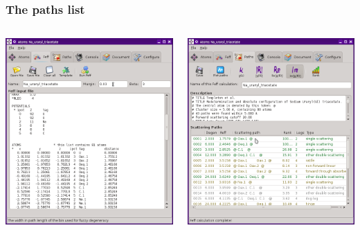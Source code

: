 \documentclass[10pt, xcolor=x11names, compress]{beamer}
\begin{document}
\begin{frame}
  \frametitle{The paths list}
  \begin{columns}[T]
    \begin{column}{0.5\linewidth}
      \begin{center}
        \includegraphics[width=0.85\linewidth]{images/feffinp.png}
      \end{center}
    \end{column}
    \begin{column}{0.5\linewidth}
      \begin{center}
        \includegraphics[width=0.85\linewidth]{images/paths.png}

\end{center}
\end{column}
\end{columns}
\end{frame}
\end{document}
